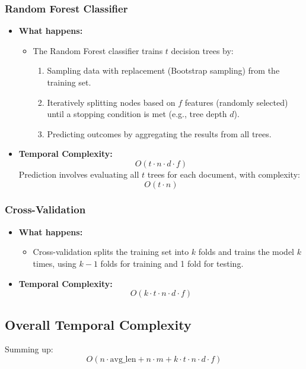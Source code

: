 \documentclass[runningheads,a4paper,11pt]{report}
\begin{document}
\subsubsection{Random Forest Classifier}
\label{section:forest-classifier}
\begin{itemize}
  \item \textbf{What happens:}
  \begin{itemize}
    \item The Random Forest classifier trains $t$ decision trees by:
    \begin{enumerate}
      \item Sampling data with replacement (Bootstrap sampling) from the training set.
      \item Iteratively splitting nodes based on $f$ features (randomly selected) until a stopping condition is met (e.g., tree depth $d$).
      \item Predicting outcomes by aggregating the results from all trees.
    \end{enumerate}
  \end{itemize}
  \item \textbf{Temporal Complexity:}
  \[
  O(t \cdot n \cdot d \cdot f)
  \]
  Prediction involves evaluating all $t$ trees for each document, with complexity:
  \[
  O(t \cdot n)
  \]
\end{itemize}

\subsubsection{Cross-Validation}
\label{section:cross-validation}
\begin{itemize}
  \item \textbf{What happens:}
  \begin{itemize}
    \item Cross-validation splits the training set into $k$ folds and trains the model $k$ times, using $k-1$ folds for training and 1 fold for testing.
  \end{itemize}
  \item \textbf{Temporal Complexity:}
  \[
  O(k \cdot t \cdot n \cdot d \cdot f)
  \]
\end{itemize}

\subsection{Overall Temporal Complexity}
\label{section:overall-temporal}
Summing up:
\[
O(n \cdot \text{avg\_len} + n \cdot m + k \cdot t \cdot n \cdot d \cdot f)
\]
\end{document}
